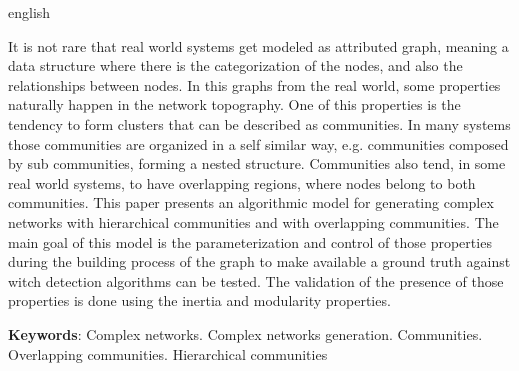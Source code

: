 \documentclass[notes.tex]{subfiles}
\begin{document}
\renewcommand{\resumoname}{Abstract}
\begin{resumoumacoluna}
 \begin{otherlanguage*}{english}
\bigskip

It is not rare that real world systems get modeled as attributed graph, meaning a data structure where there is the categorization of the nodes, and also the relationships between nodes.
In this graphs from the real world, some properties naturally happen in the network topography.
One of this properties is the tendency to form clusters that can be described as communities.
In many systems those communities are organized in a self similar way, e.g. communities composed by sub communities, forming a nested structure.
Communities also tend, in some real world systems, to have overlapping regions, where nodes belong to both communities.
This paper presents an algorithmic model for generating complex networks with hierarchical communities and with overlapping communities.
The main goal of this model is the parameterization and control of those properties during the building process of the graph to make available a ground truth against witch detection algorithms can be tested.
The validation of the presence of those properties is done using the inertia and modularity properties.

   \vspace{\onelineskip}

   \noindent
   \textbf{Keywords}: Complex networks. Complex networks generation. Communities. Overlapping communities. Hierarchical communities
 \end{otherlanguage*}
\end{resumoumacoluna}

\listoffigures*
\pagebreak

\listofquadros*
\pagebreak

\listoftables*
\pagebreak



\tableofcontents* 
\end{document}

